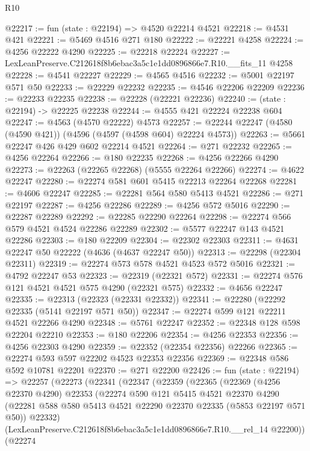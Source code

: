 \begin{lexlean}{R10}
\begin{coremodule}
@22217 := fun (state : @22194) => @4520 @22214 @4521
@22218 := @4531 @421
@22221 := @5469 @4516 @271 @180
@22222 := @22221 @4258
@22224 := @4256 @22222 @4290
@22225 := @22218 @22224
@22227 := LexLeanPreserve.C212618f8b6ebac3a5c1e1dd0896866e7.R10.__fits_11 @4258
@22228 := @4541 @22227
@22229 := @4565 @4516
@22232 := @5001 @22197 @571 @50
@22233 := @22229 @22232
@22235 := @4546 @22206 @22209
@22236 := @22233 @22235
@22238 := @22228 (@22221 @22236)
@22240 := (state : @22194) -> @22225 @22238
@22244 := @4555 @421 @22224 @22238 @604
@22247 := @4563 (@4570 @22222) @4573
@22257 := @22244 @22247 (@4580 (@4590 @421)) (@4596 (@4597 (@4598 @604) @22224 @4573))
@22263 := @5661 @22247 @426 @429 @602 @22214 @4521
@22264 := @271 @22232
@22265 := @4256 @22264
@22266 := @180 @22235
@22268 := @4256 @22266 @4290
@22273 := @22263 (@22265 @22268) (@5555 @22264 @22266)
@22274 := @4622 @22247
@22280 := @22274 @581 @601 @5415 @22213 @22264 @22268
@22281 := @4606 @22247
@22285 := @22281 @564 @580 @5413 @4521
@22286 := @271 @22197
@22287 := @4256 @22286
@22289 := @4256 @572 @5016
@22290 := @22287 @22289
@22292 := @22285 @22290 @22264
@22298 := @22274 @566 @579 @4521 @4524 @22286 @22289
@22302 := @5577 @22247 @143 @4521 @22286
@22303 := @180 @22209
@22304 := @22302 @22303
@22311 := @4631 @22247 @50 @22222 (@4636 (@4637 @22247 @50))
@22313 := @22298 (@22304 @22311)
@22319 := @22274 @573 @578 @4521 @4523 @572 @5016
@22321 := @4792 @22247 @53
@22323 := @22319 (@22321 @572)
@22331 := @22274 @576 @121 @4521 @4521 @575 @4290 (@22321 @575)
@22332 := @4656 @22247
@22335 := @22313 (@22323 (@22331 @22332))
@22341 := @22280 (@22292 @22335 (@5141 @22197 @571 @50))
@22347 := @22274 @599 @121 @22211 @4521 @22266 @4290
@22348 := @5761 @22247
@22352 := @22348 @128 @598 @22204 @22210
@22353 := @180 @22206
@22354 := @4256 @22353
@22356 := @4256 @22303 @4290
@22359 := @22352 (@22354 @22356) @22266
@22365 := @22274 @593 @597 @22202 @4523 @22353 @22356
@22369 := @22348 @586 @592 @10781 @22201
@22370 := @271 @22200
@22426 := fun (state : @22194) =>
  @22257
    (@22273
      (@22341
        (@22347
          (@22359
            (@22365
              (@22369
                (@4256 @22370 @4290)
                @22353
                (@22274
                  @590
                  @121
                  @5415
                  @4521
                  @22370
                  @4290
                  (@22281 @588 @580 @5413 @4521 @22290 @22370 @22335 (@5853 @22197 @571 @50))
                  @22332)
                (LexLeanPreserve.C212618f8b6ebac3a5c1e1dd0896866e7.R10.__rel_14 @22200))
              (@22274

\end{coremodule}
\end{lexlean}
